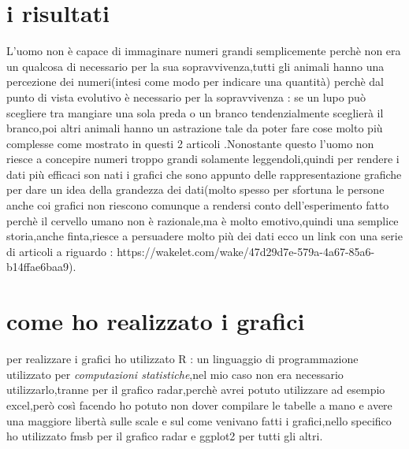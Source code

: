 \documentclass[12pt]{article}
\begin{document}
\section{i risultati}
L'uomo non è capace di immaginare numeri grandi semplicemente perchè non era un qualcosa di necessario per la sua sopravvivenza,tutti gli animali hanno una percezione dei numeri(intesi come modo per indicare una quantità) perchè dal punto di vista evolutivo è necessario per la sopravvivenza : se un lupo può scegliere tra mangiare una sola preda o un branco tendenzialmente sceglierà il branco,poi altri animali hanno un astrazione tale da poter fare cose molto più complesse come mostrato in questi 2 articoli \cite{animali,api}.Nonostante questo l'uomo non riesce a concepire numeri troppo grandi solamente leggendoli,quindi per rendere i dati più efficaci son nati i grafici che sono appunto delle rappresentazione grafiche per dare un idea della grandezza dei dati(molto spesso per sfortuna le persone anche coi grafici non riescono comunque a rendersi conto dell'esperimento fatto perchè il cervello umano non è razionale,ma è molto emotivo,quindi una semplice storia,anche finta,riesce a persuadere molto più dei dati ecco un link con una serie di articoli a riguardo : https://wakelet.com/wake/47d29d7e-579a-4a67-85a6-b14ffae6baa9).
\section{come ho realizzato i grafici}
per realizzare i grafici ho utilizzato R : un linguaggio di programmazione utilizzato per \emph{computazioni statistiche},nel mio caso non era necessario utilizzarlo,tranne per il grafico radar,perchè avrei potuto utilizzare ad esempio excel,però così facendo ho potuto non dover compilare le tabelle a mano e avere una maggiore libertà sulle scale e sul come venivano fatti i grafici,nello specifico ho utilizzato fmsb per il grafico radar e ggplot2 per tutti gli altri.
\end{document}

